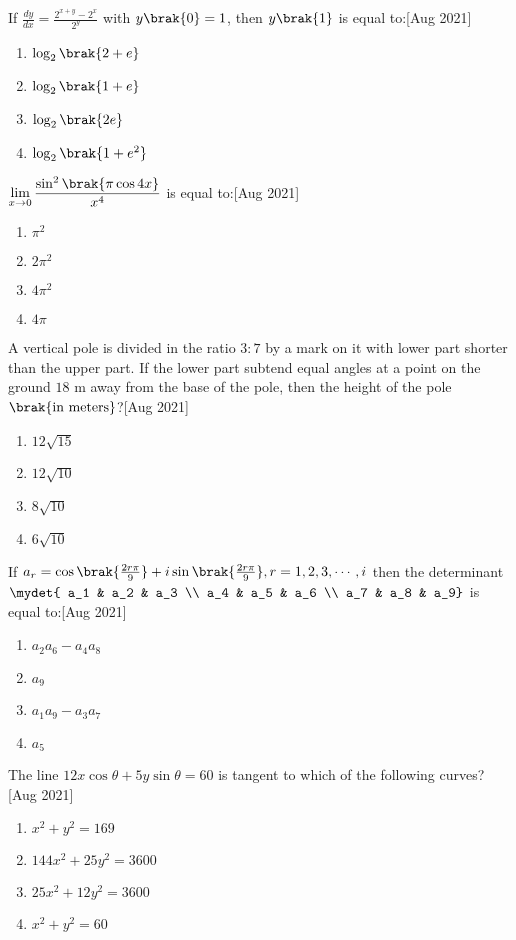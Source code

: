 \iffalse
\title{2021}
\author{ee24btech11009}
\section{mcq-single}
\fi
\item If $\frac{dy}{dx} = \frac{2^{x+y}-2^x}{2^y}$ with $y\brak{0}=1$, then $y\brak{1}$ is equal to:\hfill{[Aug 2021]}
\begin{enumerate}
\item $\log_2\brak{2 + e}$
\item $\log_2\brak{1 + e}$
\item $\log_2\brak{2e}$
\item $\log_2\brak{1 + e^2}$
\end{enumerate}
\item $\displaystyle \lim_{x \to 0} \frac{\sin^2\brak{\pi\cos 4x}}{x^4}$
is equal to:\hfill{[Aug 2021]}
\begin{enumerate}
\item $\pi^2$  
\item $2\pi^2$
\item $4\pi^2$
\item $4\pi$
\end{enumerate}
\item A vertical pole is divided in the ratio $3:7$ by a mark on it with lower part shorter than the upper part. If the lower part subtend equal angles at a point on the ground $18$ m away from the base of the pole, then the height of the pole $\brak{\text{in meters}}$?\hfill{[Aug 2021]}
\begin{enumerate}
\item $12\sqrt{15}$
\item$12\sqrt{10}$
\item $8\sqrt{10}$
\item $6\sqrt{10}$
\end{enumerate}
\item If $a_r = \cos\brak{\frac{2r\pi}{9}} + i\sin\brak{\frac{2r\pi}{9}}, r= 1,2,3,\cdots,i$ then the determinant 
$\mydet{
a_1 & a_2 & a_3 \\
a_4 & a_5 & a_6 \\
a_7 & a_8 & a_9}
$
 is equal to:\hfill{[Aug 2021]}
\begin{enumerate}
\item $a_2a_6 - a_4a_8$
\item $a_9$
\item $a_1a_9 - a_3a_7$
\item $a_5$
\end{enumerate}
\item The line $12x\cos\theta+5y\sin\theta = 60$ is tangent to which of the following curves?\hfill{[Aug 2021]}
\begin{enumerate}
\item $x^2 + y^2 = 169$
\item $144x^2 + 25y^2 = 3600$
\item $25x^2 + 12y^2 = 3600$
\item $x^2 + y^2 = 60$
\end{enumerate}
